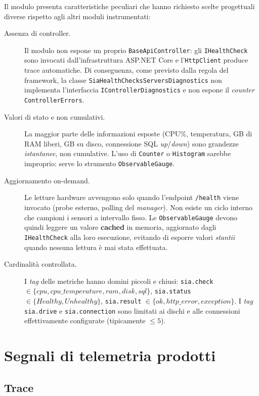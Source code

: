 Il modulo presenta caratteristiche peculiari che hanno richiesto scelte progettuali diverse
rispetto agli altri moduli instrumentati:

\begin{description}
    \item[Assenza di controller.] Il modulo non espone un proprio \texttt{BaseApiController}:
        gli \texttt{IHealthCheck} sono invocati dall'infrastruttura ASP.NET Core e
        l'\texttt{HttpClient} produce trace automatiche. Di conseguenza, come previsto
        dalla regola del framework, la classe \texttt{SiaHealthChecksServersDiagnostics} non
        implementa l'interfaccia \texttt{IControllerDiagnostics} e non espone il
        \emph{counter} \texttt{ControllerErrors}.
    \item[Valori di stato e non cumulativi.] La maggior parte delle informazioni esposte
        (CPU\%, temperatura, GB di RAM liberi, GB su disco, connessione SQL \emph{up}/\emph{down})
        sono grandezze \emph{istantanee}, non cumulative. L'uso di \texttt{Counter} o
        \texttt{Histogram} sarebbe improprio: serve lo strumento \texttt{ObservableGauge}.
    \item[Aggiornamento on-demand.] Le letture hardware avvengono solo quando l'endpoint
        \texttt{/health} viene invocato (probe esterno, polling del \emph{manager}). Non
        esiste un ciclo interno che campioni i sensori a intervallo fisso. Le
        \texttt{ObservableGauge} devono quindi leggere un valore
        \textbf{cached} in memoria, aggiornato dagli \texttt{IHealthCheck} alla loro
        esecuzione, evitando di esporre valori \emph{stantii} quando nessuna lettura è mai
        stata effettuata.
    \item[Cardinalità controllata.] I \emph{tag} delle metriche hanno domini piccoli e
        chiusi: \texttt{sia.check} $\in\{cpu, cpu\_temperature, ram, disk, sql\}$,
        \texttt{sia.status} $\in\{Healthy, Unhealthy\}$, \texttt{sia.result}
        $\in\{ok, http\_error, exception\}$. I \emph{tag} \texttt{sia.drive} e
        \texttt{sia.connection} sono limitati ai dischi e alle connessioni effettivamente
        configurate (tipicamente $\le 5$).
\end{description}

\section{Segnali di telemetria prodotti}

\subsection{Trace}

